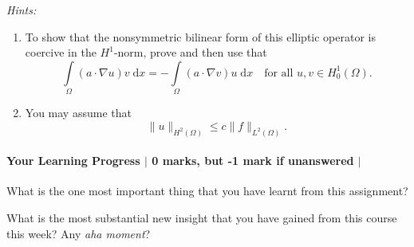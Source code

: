 \documentclass[10pt,letterpaper]{scrartcl}
\newcommand{\dx}{\;\mathrm{d}x}
\begin{document}
\emph{Hints:}
\begin{enumerate}
\item To show that the nonsymmetric bilinear form of this elliptic operator is coercive in the $H^1$-norm, prove and then use that
\begin{equation}
\int\limits_\Omega (a\cdot \nabla u)v \dx = - \int\limits_\Omega (a\cdot \nabla v)u \dx \quad \text{for all } u,v \in H^1_0(\Omega).
\end{equation}
\item You may assume that
\begin{equation}
\lVert u \rVert_{H^2(\Omega)} \leq c \lVert f \rVert_{L^2(\Omega)}.
\end{equation}
\end{enumerate}

\newpage

\mbox{}

\newpage

\mbox{}

\newpage

\mbox{}

\vfill

\paragraph*{Your Learning Progress $\vert$ 0 marks, but -1 mark if unanswered $\vert$ \faFilePdfO}
What is the one most important thing that you have learnt from this assignment?

\vspace*{3mm}
\hrulefill

\vspace*{3mm}
\hrulefill

\vspace*{3mm}
\hrulefill

What is the most substantial new insight that you have gained from this course this week? Any \emph{aha moment}?

\vspace*{3mm}
\hrulefill

\vspace*{3mm}
\hrulefill

\vspace*{3mm}
\hrulefill
\end{document}
